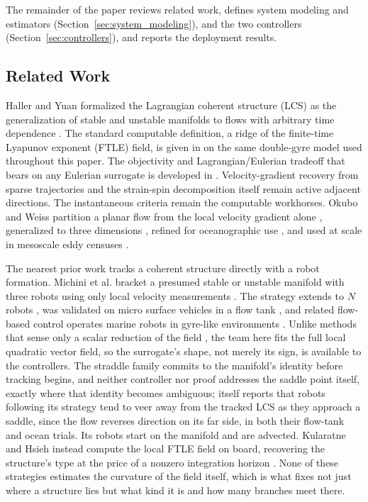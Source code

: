 \documentclass[lettersize,journal]{IEEEtran}
\begin{document}
The remainder of the paper reviews related work, defines system modeling
and estimators (Section~\ref{sec:system_modeling}), and the two controllers
(Section~\ref{sec:controllers}), and reports the deployment results.

\subsection{Related Work}
\label{sec:related_robots}

Haller and Yuan formalized the Lagrangian coherent structure (LCS) as
the generalization of stable and unstable manifolds to flows with
arbitrary time dependence \cite{13}. The standard computable definition,
a ridge of the finite-time Lyapunov exponent (FTLE) field, is given in
\cite{15} on the same double-gyre model used throughout this paper. The
objectivity and Lagrangian/Eulerian tradeoff that bears on any Eulerian
surrogate is developed in \cite{23,24,25}. Velocity-gradient
recovery from sparse trajectories \cite{26} and the strain-spin
decomposition itself \cite{27} remain active adjacent directions. The
instantaneous criteria remain the computable workhorses. Okubo and Weiss
partition a planar flow from the local velocity gradient alone
\cite{28,29}, generalized to three dimensions \cite{30}, refined for
oceanographic use \cite{31}, and used at scale in mesoscale eddy censuses
\cite{16}.

The nearest prior work tracks a coherent structure directly with a
robot formation. Michini et al. bracket a presumed stable or unstable
manifold with three robots using only local velocity measurements
\cite{17}. The strategy extends to $N$ robots \cite{18}, was validated
on micro surface vehicles in a flow tank \cite{19}, and related
flow-based control operates marine robots in gyre-like environments
\cite{20}. Unlike methods that sense only a scalar reduction of the
field \cite{32}, the team here fits the full local quadratic vector
field, so the surrogate's shape, not merely its sign, is available to
the controllers. The straddle family commits to the manifold's identity
before tracking begins, and neither controller nor proof addresses the
saddle point itself, exactly where that identity becomes ambiguous;
\cite{17} itself reports that robots following its strategy tend to
veer away from the tracked LCS as they approach a saddle, since the
flow reverses direction on its far side, in both their flow-tank and
ocean trials. Its robots start on the manifold and are advected.
Kularatne and Hsieh instead compute the local FTLE field on board,
recovering the structure's type at the price of a nonzero integration
horizon \cite{21}. None of these strategies estimates the curvature of
the field itself, which is what fixes not just where a structure lies
but what kind it is and how many branches meet there.
\end{document}
